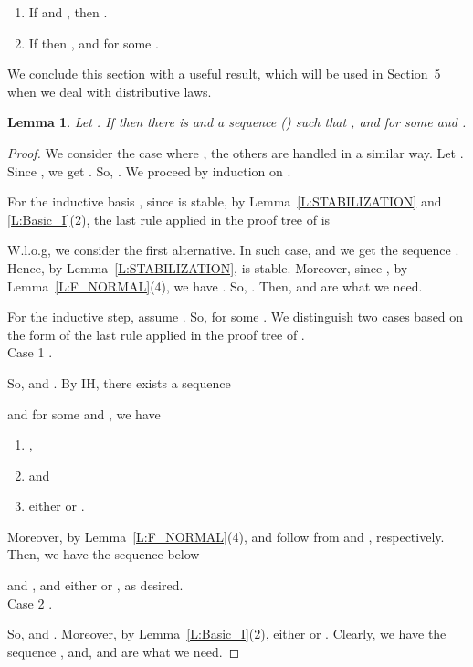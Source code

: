 \documentclass{elsarticle}
\theoremstyle{plain}
\newtheorem{lemma}[theorem]{Lemma}
\theoremstyle{definition}
\begin{document}
\begin{enumerate}
  \item   If  and , then .
  \item  If  then ,  and  for some .
\end{enumerate}

We conclude this section with a useful result, which will be used in Section~5 when we deal with distributive laws.

\begin{lemma}\label{L:DIS}
    Let . If   then there is  and a sequence  () such that ,  and  for some  and .
\end{lemma}
\begin{proof}
   We consider the case where , the others are handled in a similar way.
   Let .
   Since , we get .
   So, . We proceed by induction on .


   For the inductive basis , since  is stable, by Lemma~\ref{L:STABILIZATION} and \ref{L:Basic_I}(2), the last rule applied in the proof tree of  is
   
   W.l.o.g, we consider the first alternative.
   In such case,  and we get the sequence .
   Hence, by Lemma~\ref{L:STABILIZATION},  is stable.
   Moreover, since , by Lemma~\ref{L:F_NORMAL}(4), we  have .
   So, .  Then,  and  are what we need.

   For the inductive step, assume .
   So,  for some .
   We distinguish two cases based on the form of the last rule applied in the proof tree of .\\

   \noindent Case 1 .

    So,  and .
    By IH, there exists a sequence
   
    and for some  and , we have
    \begin{enumerate}
      \item  ,
      \item  and
      \item either  or .
    \end{enumerate}
   Moreover, by Lemma~\ref{L:F_NORMAL}(4),  and  follow from  and , respectively.
   Then, we have the sequence below
   
   and ,  and either  or , as desired.\\

   \noindent  Case 2 .

    So,  and .
    Moreover, by Lemma~\ref{L:Basic_I}(2), either  or . Clearly, we have the sequence , and,  and  are what we need.
\end{proof}
\end{document}
